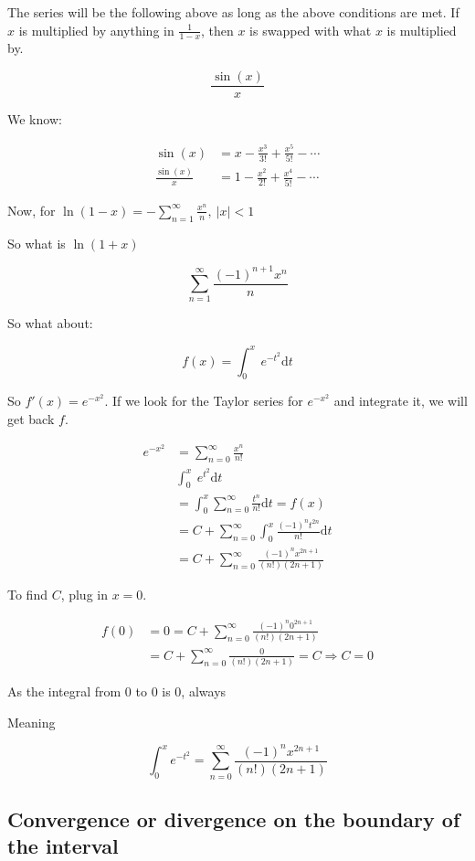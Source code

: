 \documentclass[12pt]{article}
\theoremstyle{plain}
\theoremstyle{remark}
\theoremstyle{definition}
\begin{document}
The series will be the following above as long as the above conditions
are met. If \(x\) is multiplied by anything in \(\frac{1}{1 - x}\), then
\(x\) is swapped with what \(x\) is multiplied by.

\[\frac{\sin(x)}{x}\]

We know:

\begin{align*}
\sin(x) &= x - \frac{x^{3}}{3!} + \frac{x^{5}}{5!} - \cdots \\
\frac{\sin(x)}{x} &= 1 - \frac{x^{2}}{2!} + \frac{x^{4}}{5!} - \cdots
\end{align*}


Now, for
\(\ln(1 - x) = - \sum_{n = 1}^{\infty}\frac{x^{n}}{n},\ |x| < 1\)

So what is \(\ln(1 + x)\)

\[\sum_{n = 1}^{\infty}\frac{( - 1)^{n + 1}x^{n}}{n}\]

So what about:

\[f(x) = \int_{0}^{x}{\ e^{- t^{2}}\text{d}t}\]

So \(f'(x) = e^{- x^{2}}\). If we look for the Taylor series for
\(e^{- x^{2}}\) and integrate it, we will get back \(f\).

\begin{align*}
e^{- x^{2}} &= \sum_{n = 0}^{\infty}\frac{x^{n}}{n!} \\
&\int_{0}^{x}{\ e^{t^{2}}\text{d}t}  \\
&= \int_{0}^{x}{\sum_{n = 0}^{\infty}\frac{t^{n}}{n!}}\text{d}t = f(x)  \\
&= C + \sum_{n = 0}^{\infty}{\int_{0}^{x}{\frac{( - 1)^{n}t^{2n}}{n!}\text{d}t}} \\
&= C + \sum_{n = 0}^{\infty}\frac{( - 1)^{n}x^{2n + 1}}{(n!)(2n + 1)}
\end{align*}


To find \(C\), plug in \(x = 0\).

\begin{align*}
f(0) &= 0 = C + \sum_{n = 0}^{\infty}\frac{( - 1)^{n}0^{2n + 1}}{(n!)(2n + 1)} \\
&= C + \sum_{n = 0}^{\infty}\frac{0}{(n!)(2n + 1)} = C \Rightarrow C = 0
\end{align*}


As the integral from 0 to 0 is 0, always

Meaning

\[\int_{0}^{x}e^{{- t}^{2}} = \sum_{n = 0}^{\infty}\frac{( - 1)^{n}x^{2n + 1}}{(n!)(2n + 1)}\]


\subsection{Convergence or divergence on the boundary of the
interval}
\end{document}
